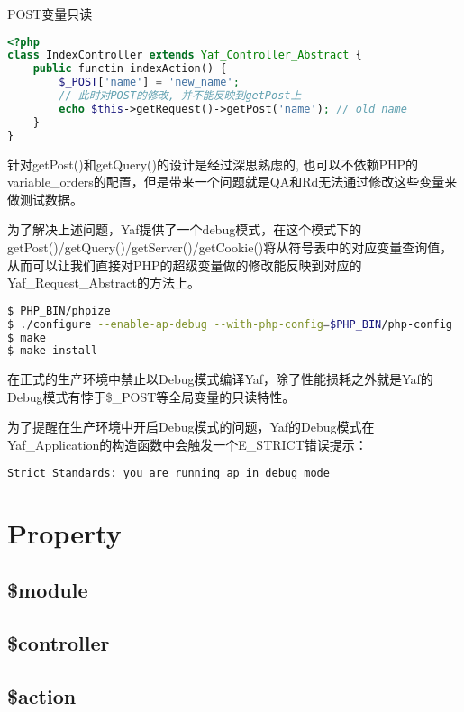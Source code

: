 \begin{example}
POST变量只读
\begin{lstlisting}[language=PHP]
<?php
class IndexController extends Yaf_Controller_Abstract {
    public functin indexAction() {
        $_POST['name'] = 'new_name';
        // 此时对POST的修改, 并不能反映到getPost上
        echo $this->getRequest()->getPost('name'); // old name
    }
}
\end{lstlisting}
\end{example}

针对getPost()和getQuery()的设计是经过深思熟虑的, 也可以不依赖PHP的variable\_orders的配置，但是带来一个问题就是QA和Rd无法通过修改这些变量来做测试数据。

为了解决上述问题，Yaf提供了一个debug模式，在这个模式下的getPost()/getQuery()/getServer()/getCookie()将从符号表中的对应变量查询值，从而可以让我们直接对PHP的超级变量做的修改能反映到对应的Yaf\_Request\_Abstract的方法上。

\begin{lstlisting}[language=bash]
$ PHP_BIN/phpize
$ ./configure --enable-ap-debug --with-php-config=$PHP_BIN/php-config
$ make
$ make install  
\end{lstlisting}


在正式的生产环境中禁止以Debug模式编译Yaf，除了性能损耗之外就是Yaf的Debug模式有悖于\$\_POST等全局变量的只读特性。

为了提醒在生产环境中开启Debug模式的问题，Yaf的Debug模式在Yaf\_Application的构造函数中会触发一个E\_STRICT错误提示：

\begin{lstlisting}[language=bash]
Strict Standards: you are running ap in debug mode
\end{lstlisting}




\section{Property}


\subsection{\$module}

\subsection{\$controller}
\subsection{\$action}
